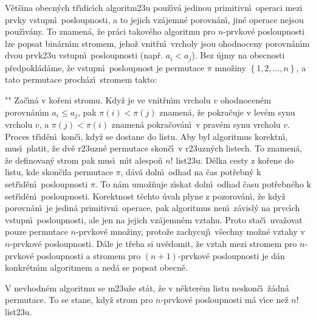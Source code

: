 \flushpar V\v et\v sina obecn\'ych t\v r\'\i dic\'\i ch algoritm\accent23u 
pou\v z\'\i v\'a jedinou primitivn\'\i\ operaci mezi prvky vstupn\'\i\ 
posloupnosti, a to jejich vz\'a\-jemn\'e porov\-n\'an\'\i , jin\'e 
operace nejsou pou\v z\'\i v\'any. To znamen\'a, \v ze pr\'aci 
takov\'eho algoritmu pro $n$-prvkov\'e posloupnosti lze po\-psat 
bin\'arn\'\i m stro\-mem, jeho\v z vnit\v rn\'\i\ vrcholy jsou ohodnoceny 
porovn\'an\'\i m dvou prvk\accent23u vstupn\'\i\ posloupnosti 
(nap\v r. $a_i<a_j$). Bez \'ujmy na obecnosti p\v redpokl\'ad\'ame, \v ze 
vstupn\'\i\ posloupnost je permutace $\pi$
mno\v ziny $\left\{1,2,\dots,n\right\}$, a tato permutace proch\'az\'\i\ 
stromem takto:
\roster
\item"{}"
Za\v c\'\i n\'a v ko\v reni stromu. Kdy\v z je ve vnit\v rn\'\i m vrcholu $
v$ 
ohodnocen\'em porovn\'an\'\i m $a_i\le a_j$, pak $\pi \left(i\right)<\pi \left(j\right)$ znamen\'a, 
\v ze pokra\v cuje v lev\'em synu vrcholu $v$, a $\pi \left(j\right)<\pi \left(i\right)$ 
znamen\'a pokra\v cov\'an\'\i\ v prav\'em synu vrcholu $v$. Proces 
t\v r\'\i d\v en\'\i\ kon\v c\'\i , kdy\v z se dostane do listu.
\endroster
Aby byl algoritmus korektn\'\i , mus\'\i\ platit, \v ze dv\v e 
r\accent23uzn\'e permutace skon\v c\'\i\ v r\accent23uzn\'ych 
listech.  To znamen\'a, \v ze definovan\'y strom pak mus\'\i\ m\'\i t 
alespo\v n $n!$ list\accent23u.  D\'elka cesty z ko\v rene do listu, 
kde skon\v cila permutace $\pi$, d\'av\'a doln\'\i\ odhad na \v cas 
pot\v rebn\'y k set\v r\'\i d\v en\'\i\ posloupnosti $\pi$. To n\'am umo\v z\v nuje 
z\'\i skat doln\'\i\ odhad \v casu pot\v rebn\'eho k set\v r\'\i d\v en\'\i\ 
posloupnosti. Korektnost t\v echto \'uvah plyne z pozorov\'an\'\i , 
\v ze kdy\v z porovn\'an\'\i\ je jedin\'a primi\-tivn\'\i\ operace, pak 
algoritmus nen\'\i\ z\'avisl\'y na prvc\'\i ch vstup\-n\'\i\ 
posloupnosti, ale jen na jejich vz\'ajemn\'em vztahu. 
Proto sta\v c\'\i\ uva\v zovat pouze permutace $n$-prvkov\'e mno\v ziny, 
proto\v ze za\-chycuj\'\i\ v\v sechny mo\v zn\'e vztahy v $n$-prvkov\'e 
posloupnosti. D\'a\-le je t\v reba si uv\v edomit, \v ze vztah mezi 
stromem pro $n$-prvkov\'e posloupnosti a stromem pro 
$\left(n+1\right)$-prvkov\'e posloupnosti je d\'an konkr\'etn\'\i m algoritmem a 
ned\'a se popsat obecn\v e. 
\medskip

\flushpar V nevhodn\'em algoritmu se m\accent23u\v ze st\'at, \v ze 
v n\v ekter\'em listu neskon\v c\'\i\ \v z\'adn\'a permutace. To se 
stane, kdy\v z strom pro $n$-prvkov\'e posloupnosti m\'a v\'\i ce 
ne\v z $n!$ list\accent23u.
\medskip

